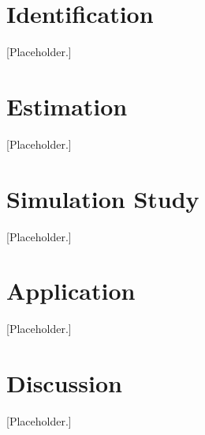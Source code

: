 \documentclass[12pt]{article}
\begin{document}
\section{Identification}
\label{sec:id}
[Placeholder.]

\section{Estimation}
\label{sec:estimation}
[Placeholder.]

\section{Simulation Study}
\label{sec:sims}
[Placeholder.]

\section{Application}
\label{sec:application}
[Placeholder.]

\section{Discussion}
\label{sec:discussion}
[Placeholder.]



\end{document}

